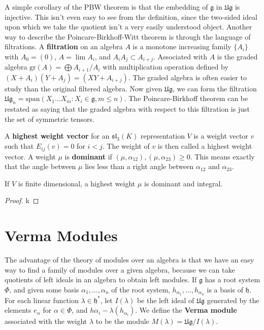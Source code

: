 A simple corollary of the PBW theorem is that the embedding of $\mathfrak{g}$ in $\mathfrak{Ug}$ is injective. This isn't even easy to see from the definition, since the two-sided ideal upon which we take the quotient isn't a very easily understood object. Another way to describe the Poincare-Birkhoff-Witt theorem is through the language of filtrations. A {\bf filtration} on an algebra $A$ is a monotone increasing family $\{ A_i \}$ with $A_0 = (0)$, $A = \lim A_i$, and $A_i A_j \subset A_{i + j}$. Associated with $A$ is the graded algebra $\text{gr}(A) = \bigoplus A_{i+1}/A_i$ with multiplication operation defined by $(X + A_i)(Y + A_j) = (XY + A_{i+j})$. The graded algebra is often easier to study than the original filtered algebra. Now given $\mathfrak{Ug}$, we can form the filtration $\mathfrak{Ug}_n = \text{span}(X_1 \dots X_m : X_i \in \mathfrak{g}, m \leq n)$. The Poincare-Birkhoff theorem can be restated as saying that the graded algebra with respect to this filtration is just the set of symmetric tensors.







A {\bf highest weight vector} for an $\mathfrak{sl}_3(K)$ representation $V$ is a weight vector $v$ such that $E_{ij}(v) = 0$ for $i < j$. The weight of $v$ is then called a highest weight vector. A weight $\mu$ is {\bf dominant} if $(\mu, \alpha_{12}), (\mu, \alpha_{23}) \geq 0$. This means exactly that the angle between $\mu$ lies less than a right angle between $\alpha_{12}$ and $\alpha_{23}$.

\begin{lemma}
    If $V$ is finite dimensional, a highest weight $\mu$ is dominant and integral.
\end{lemma}
\begin{proof}
    k
\end{proof}








\section{Verma Modules}

The advantage of the theory of modules over an algebra is that we have an easy way to find a family of modules over a given algebra, because we can take quotients of left ideals in an algebra to obtain left modules. If $\mathfrak{g}$ has a root system $\Phi$, and given some basis $\alpha_1, \dots, \alpha_n$ of the root system, $h_{\alpha_1}, \dots, h_{\alpha_n}$ is a basis of $\mathfrak{h}$. For each linear function $\lambda \in \mathfrak{h}^*$, let $I(\lambda)$ be the left ideal of $\mathfrak{Ug}$ generated by the elements $e_\alpha$ for $\alpha \in \Phi$, and $h{\alpha_i} - \lambda(h_{\alpha_i})$. We define the {\bf Verma module} associated with the weight $\lambda$ to be the module $M(\lambda) = \mathfrak{Ug}/I(\lambda)$.

